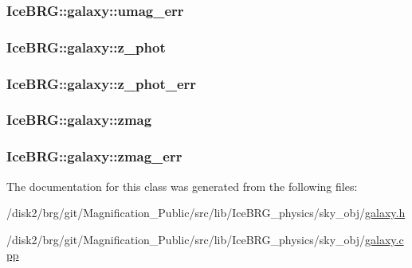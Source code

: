\subsubsection[{umag\+\_\+err}]{ Ice\+B\+R\+G\+::galaxy\+::umag\+\_\+err}\label{classIceBRG_1_1galaxy_a30b942361741bef78d8ddcad7617c183}
\hypertarget{classIceBRG_1_1galaxy_a0b3002808e23ef0e4f4d2f59c8d5a17c}{}
\subsubsection[{z\+\_\+phot}]{ Ice\+B\+R\+G\+::galaxy\+::z\+\_\+phot}\label{classIceBRG_1_1galaxy_a0b3002808e23ef0e4f4d2f59c8d5a17c}
\hypertarget{classIceBRG_1_1galaxy_a5e57bc37cf982498c52e5c6c3c878f4c}{}
\subsubsection[{z\+\_\+phot\+\_\+err}]{ Ice\+B\+R\+G\+::galaxy\+::z\+\_\+phot\+\_\+err}\label{classIceBRG_1_1galaxy_a5e57bc37cf982498c52e5c6c3c878f4c}
\hypertarget{classIceBRG_1_1galaxy_a7280a37dab3a5b216d142fc09aeb9e66}{}
\subsubsection[{zmag}]{ Ice\+B\+R\+G\+::galaxy\+::zmag}\label{classIceBRG_1_1galaxy_a7280a37dab3a5b216d142fc09aeb9e66}
\hypertarget{classIceBRG_1_1galaxy_a10f5d8641137459cd7f6dc8e58b4aa39}{}
\subsubsection[{zmag\+\_\+err}]{ Ice\+B\+R\+G\+::galaxy\+::zmag\+\_\+err}\label{classIceBRG_1_1galaxy_a10f5d8641137459cd7f6dc8e58b4aa39}


The documentation for this class was generated from the following files\+:\begin{DoxyCompactItemize}
\item 
/disk2/brg/git/\+Magnification\+\_\+\+Public/src/lib/\+Ice\+B\+R\+G\+\_\+physics/sky\+\_\+obj/\hyperlink{galaxy_8h}{galaxy.\+h}\item 
/disk2/brg/git/\+Magnification\+\_\+\+Public/src/lib/\+Ice\+B\+R\+G\+\_\+physics/sky\+\_\+obj/\hyperlink{galaxy_8cpp}{galaxy.\+cpp}\end{DoxyCompactItemize}
